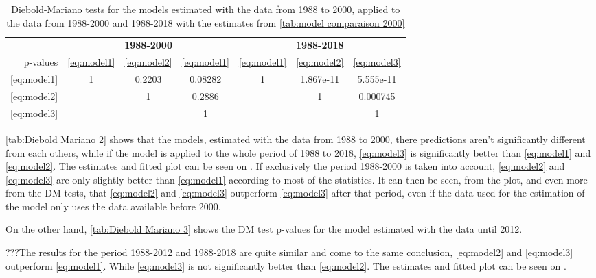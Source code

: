 \documentclass[12pt,a4paper,oneside]{book}
\begin{document}
\begin{table}[htp!]
     \caption{Diebold-Mariano tests for the models estimated with the data from 1988 to 2000, applied to the data from 1988-2000 and 1988-2018 with the estimates from \autoref{tab:model comparaison 2000}}
    \label{tab:Diebold Mariano 2}
    \centering \footnotesize
    \begin{tabular}{| r | c c c | c c c |}
 \multicolumn{1}{r}{} &    \multicolumn{3}{c}{\textbf{1988-2000}} &    \multicolumn{3}{c}{\textbf{1988-2018}} \\ \cline{2-7}
 \multicolumn{0}{r|}{p-values}	& \ref{eq:model1} & \ref{eq:model2} & \ref{eq:model1} & \ref{eq:model1} & \ref{eq:model2} & \ref{eq:model3} \\ \cline{1-7}
 \ref{eq:model1} & 1 & 0.2203 & 0.08282  & 1 & 1.867e-11 & 5.555e-11 \\ 
 \ref{eq:model2} &   & 1  	& 0.2886  	&   & 1 & 0.000745 \\
 \ref{eq:model3} &   &    & 1 &   &   & 1   \\ \cline{1-7}
\end{tabular}
\end{table}

\autoref{tab:Diebold Mariano 2} shows that the models, estimated with the data from 1988 to 2000, there predictions aren't significantly different from each others, while if the model is applied to the whole period of 1988 to 2018, \ref{eq:model3} is significantly better than \ref{eq:model1} and \ref{eq:model2}.
The estimates and fitted plot can be seen on .
If exclusively the period 1988-2000 is taken into account, \ref{eq:model2} and \ref{eq:model3} are only slightly better than \ref{eq:model1} according to most of the statistics.
It can then be seen, from the plot, and even more from the DM tests, that \ref{eq:model2} and \ref{eq:model3} outperform \ref{eq:model3} after that period, even if the data used for the estimation of the model only uses the data available before 2000.


On the other hand, \autoref{tab:Diebold Mariano 3} shows the DM test p-values for the model estimated with the data until 2012. 

???The results for the period 1988-2012 and 1988-2018 are quite similar and come to the same conclusion, \ref{eq:model2} and \ref{eq:model3} outperform \ref{eq:model1}. While \ref{eq:model3} is not significantly better than \ref{eq:model2}.
The estimates and fitted plot can be seen on . 
\end{document}
